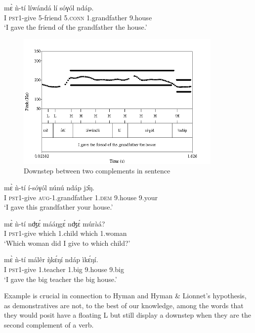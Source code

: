 \documentclass[output=paper,newtxmath,modfonts,nonflat,hidelinks]{langsci/langscibook}
\begin{document}
\ea \gll m\`ɛ ǹ-tí líw{á}nd{á} lí sóγól {\↓}nd{á}p.\\
I \textsc{pst1}-give 5-friend 5.\textsc{conn} 1.grandfather 9.house\\
\glt `I gave the friend of the grandfather the house.'\label{ex:HamlaouiMakasso:8} 
\z


\begin{figure}[h]
\caption{Downstep between two complements in sentence  \label{fig:HamlaouiMakasso:5}}
\includegraphics[width=10cm]{figures/ComplexO1Sept16B}
\end{figure}



\ea \gll m\`ɛ ǹ-tí í-{\↓}sóγól núnú {\↓}nd{á}p j\^ɔŋ.\\
I \textsc{pst1}-give \textsc{aug}-1.grandfather  1.\textsc{dem} 9.house 9.your\\
\glt `I gave this grandfather your house.'\label{ex:HamlaouiMakasso:9}
\z

\ea \gll  m\`ɛ ǹ-tí nʤ\'ɛ m{á}{á}ŋg\'ɛ {\↓}nʤ\'ɛ múrà{á}?\\
I \textsc{pst1}-give which 1.child which 1.woman\\
\glt `Which woman did I give to which child?'\label{ex:HamlaouiMakasso:10}
\z

\ea \gll  m\`ɛ ǹ-tí m{á}lêr \`ŋk\'ɛŋí {\↓}nd{á}p ìk\'ɛŋí.\\
I \textsc{pst1}-give 1.teacher 1.big 9.house 9.big\\
\glt `I gave the big teacher the big house.'\label{ex:HamlaouiMakasso:11}
\z


\noindent Example  is crucial in connection to Hyman and Hyman \& Lionnet's hypothesis, as demonstratives are not, to the best of our knowledge, among the words that they would posit have a floating L  but still display a downstep when they are the second complement of a verb.
\end{document}
